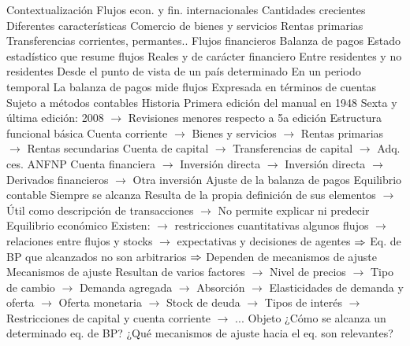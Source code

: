 \documentclass{nuevotema}
\begin{document}
\esquemalargo












\begin{esquemal}
	\1[] 
		\2 Contextualización
			\3 Flujos econ. y fin. internacionales
				\4 Cantidades crecientes
				\4 Diferentes características
				\4 Comercio de bienes y servicios
				\4 Rentas primarias
				\4 Transferencias corrientes, permantes..
				\4 Flujos financieros
			\3 Balanza de pagos
				\4 Estado estadístico que resume flujos
				\4[] Reales y de carácter financiero
				\4 Entre residentes y no residentes
				\4[] Desde el punto de vista de un país determinado
				\4 En un periodo temporal
				\4[] La balanza de pagos mide flujos
				\4 Expresada en términos de cuentas
				\4[] Sujeto a métodos contables
				\4 Historia
				\4[] Primera edición del manual en 1948
				\4[] Sexta y última edición: 2008
				\4[] $\to$ Revisiones menores respecto a 5a edición
				\4 Estructura funcional básica
				\4[] Cuenta corriente
				\4[] $\to$ Bienes y servicios
				\4[] $\to$ Rentas primarias
				\4[] $\to$ Rentas secundarias
				\4[] Cuenta de capital
				\4[] $\to$ Transferencias de capital
				\4[] $\to$ Adq. ces. ANFNP
				\4[] Cuenta financiera
				\4[] $\to$ Inversión directa
				\4[] $\to$ Inversión directa
				\4[] $\to$ Derivados financieros
				\4[] $\to$ Otra inversión
			\3 Ajuste de la balanza de pagos
				\4 Equilibrio contable
				\4[] Siempre se alcanza
				\4[] Resulta de la propia definición de sus elementos
				\4[] $\to$ Útil como descripción de transacciones
				\4[] $\to$ No permite explicar ni predecir
				\4 Equilibrio económico
				\4[] Existen:
				\4[] $\to$ restricciones cuantitativas algunos flujos
				\4[] $\to$ relaciones entre flujos y stocks
				\4[] $\to$ expectativas y decisiones de agentes
				\4[] $\Rightarrow$ Eq. de BP que alcanzados no son arbitrarios
				\4[] $\Rightarrow$ Dependen de mecanismos de ajuste
				\4 Mecanismos de ajuste
				\4[] Resultan de varios factores
				\4[] $\to$ Nivel de precios
				\4[] $\to$ Tipo de cambio
				\4[] $\to$ Demanda agregada
				\4[] $\to$ Absorción
				\4[] $\to$ Elasticidades de demanda y oferta
				\4[] $\to$ Oferta monetaria
				\4[] $\to$ Stock de deuda
				\4[] $\to$ Tipos de interés
				\4[] $\to$ Restricciones de capital y cuenta corriente
				\4[] $\to$ ...
		\2 Objeto
			\3 ¿Cómo se alcanza un determinado eq. de BP?
			\3 ¿Qué mecanismos de ajuste hacia el eq. son relevantes?

\end{esquemal}
\end{document}
